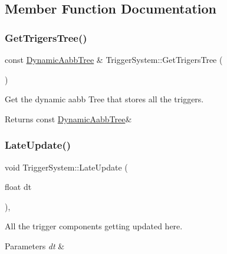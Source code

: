 \subsection{Member Function Documentation}
\mbox{\label{classTriggerSystem_a1f187d6138a8048080ba96e98044cef8}} 
\subsubsection{\texorpdfstring{Get\+Trigers\+Tree()}{GetTrigersTree()}}
{\footnotesize\ttfamily const \hyperlink{classDynamicAabbTree}{Dynamic\+Aabb\+Tree} \& Trigger\+System\+::\+Get\+Trigers\+Tree (\begin{DoxyParamCaption}{ }\end{DoxyParamCaption})}



Get the dynamic aabb Tree that stores all the triggers. 

\begin{DoxyReturn}{Returns}
const \hyperlink{classDynamicAabbTree}{Dynamic\+Aabb\+Tree}\& 
\end{DoxyReturn}
\mbox{\label{classTriggerSystem_a804c490350677fea99a385b1f22a85b6}} 
\subsubsection{\texorpdfstring{Late\+Update()}{LateUpdate()}}
{\footnotesize\ttfamily void Trigger\+System\+::\+Late\+Update (\begin{DoxyParamCaption}\item[{float}]{dt }\end{DoxyParamCaption})\hspace{0.3cm}{\ttfamily [override]}, {\ttfamily [virtual]}}



All the trigger components getting updated here. 


\begin{DoxyParams}{Parameters}
{\em dt} & \\
\hline
\end{DoxyParams}



